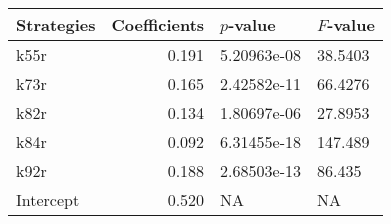 \begin{tabular}{lrll}
\toprule
Strategies &  Coefficients &    $p$-value & $F$-value \\
\midrule
      k55r &         0.191 &  5.20963e-08 &   38.5403 \\
      k73r &         0.165 &  2.42582e-11 &   66.4276 \\
      k82r &         0.134 &  1.80697e-06 &   27.8953 \\
      k84r &         0.092 &  6.31455e-18 &   147.489 \\
      k92r &         0.188 &  2.68503e-13 &    86.435 \\
 Intercept &         0.520 &           NA &        NA \\
\bottomrule
\end{tabular}
